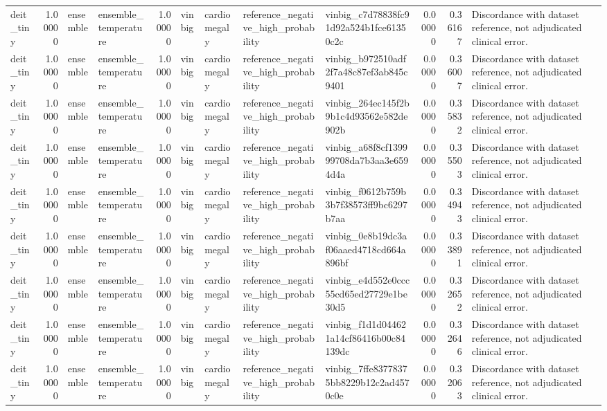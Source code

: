 \begin{tabular}{lrllrllllrrl}
deit\_tiny & 1.00000 & ensemble & ensemble\_temperature & 1.00000 & vinbig & cardiomegaly & reference\_negative\_high\_probability & vinbig\_c7d78838fc91d92a524b1fce61350c2c & 0.00000 & 0.36167 & Discordance with dataset reference, not adjudicated clinical error. \\
deit\_tiny & 1.00000 & ensemble & ensemble\_temperature & 1.00000 & vinbig & cardiomegaly & reference\_negative\_high\_probability & vinbig\_b972510adf2f7a48c87ef3ab845c9401 & 0.00000 & 0.36007 & Discordance with dataset reference, not adjudicated clinical error. \\
deit\_tiny & 1.00000 & ensemble & ensemble\_temperature & 1.00000 & vinbig & cardiomegaly & reference\_negative\_high\_probability & vinbig\_264ec145f2b9b1c4d93562e582de902b & 0.00000 & 0.35832 & Discordance with dataset reference, not adjudicated clinical error. \\
deit\_tiny & 1.00000 & ensemble & ensemble\_temperature & 1.00000 & vinbig & cardiomegaly & reference\_negative\_high\_probability & vinbig\_a68f8cf139999708da7b3aa3e6594d4a & 0.00000 & 0.35503 & Discordance with dataset reference, not adjudicated clinical error. \\
deit\_tiny & 1.00000 & ensemble & ensemble\_temperature & 1.00000 & vinbig & cardiomegaly & reference\_negative\_high\_probability & vinbig\_f0612b759b3b7f38573ff9bc6297b7aa & 0.00000 & 0.34943 & Discordance with dataset reference, not adjudicated clinical error. \\
deit\_tiny & 1.00000 & ensemble & ensemble\_temperature & 1.00000 & vinbig & cardiomegaly & reference\_negative\_high\_probability & vinbig\_0e8b19dc3af06aaed4718cd664a896bf & 0.00000 & 0.33891 & Discordance with dataset reference, not adjudicated clinical error. \\
deit\_tiny & 1.00000 & ensemble & ensemble\_temperature & 1.00000 & vinbig & cardiomegaly & reference\_negative\_high\_probability & vinbig\_e4d552e0ccc55cd65ed27729e1be30d5 & 0.00000 & 0.32652 & Discordance with dataset reference, not adjudicated clinical error. \\
deit\_tiny & 1.00000 & ensemble & ensemble\_temperature & 1.00000 & vinbig & cardiomegaly & reference\_negative\_high\_probability & vinbig\_f1d1d044621a14cf86416b00c84139dc & 0.00000 & 0.32646 & Discordance with dataset reference, not adjudicated clinical error. \\
deit\_tiny & 1.00000 & ensemble & ensemble\_temperature & 1.00000 & vinbig & cardiomegaly & reference\_negative\_high\_probability & vinbig\_7ffe83778375bb8229b12c2ad4570c0e & 0.00000 & 0.32063 & Discordance with dataset reference, not adjudicated clinical error. \\

\end{tabular}

